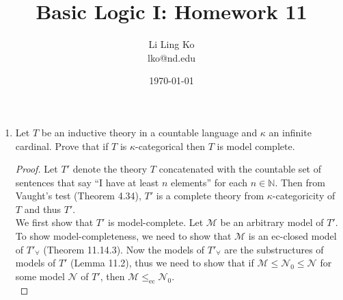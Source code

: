 \documentclass{article}
\begin{document}
\title{Basic Logic I: Homework 11}
\author{Li Ling Ko\\ lko@nd.edu}
\date{\today}
\maketitle

\begin{enumerate}[label={\bf Q\arabic*:}]
  \item Let $T$ be an inductive theory in a countable language and $\kappa$
    an infinite cardinal. Prove that if $T$ is $\kappa$-categorical then
    $T$ is model complete.

    \begin{proof}
      Let $T'$ denote the theory $T$ concatenated with the countable set of
      sentences that say ``I have at least $n$ elements'' for each
      $n\in\mathbb{N}$. Then from Vaught's test (Theorem 4.34), $T'$ is a
      complete theory from $\kappa$-categoricity of $T$ and thus $T'$. \\


      We first show that $T'$ is model-complete. Let $\mathcal{M}$ be an
      arbitrary model of $T'$. To show model-completeness, we need to show
      that $\mathcal{M}$ is an ec-closed model of $T'_\forall$ (Theorem
      11.14.3). Now the models of $T'_\forall$ are the substructures of
      models of $T'$ (Lemma 11.2), thus we need to show that if
      $\mathcal{M}\leq \mathcal{N}_0\leq\mathcal{N}$ for some model
      $\mathcal{N}$ of $T'$, then
      $\mathcal{M}\leq_{\text{ec}}\mathcal{N}_0$. \\


\end{proof}
\end{enumerate}
\end{document}
